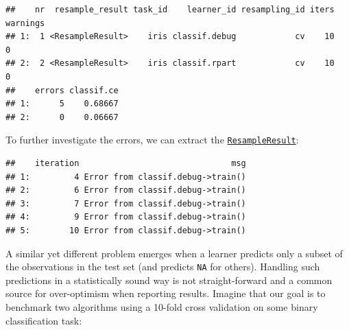 \documentclass[]{scrbook}
\newenvironment{Shaded}{\begin{snugshade}}{\end{snugshade}}
\newcommand{\DataTypeTok}[1]{\textcolor[rgb]{0.13,0.29,0.53}{#1}}
\newcommand{\FloatTok}[1]{\textcolor[rgb]{0.00,0.00,0.81}{#1}}
\newcommand{\KeywordTok}[1]{\textcolor[rgb]{0.13,0.29,0.53}{\textbf{#1}}}
\newcommand{\NormalTok}[1]{#1}
\newcommand{\OperatorTok}[1]{\textcolor[rgb]{0.81,0.36,0.00}{\textbf{#1}}}
\newcommand{\OtherTok}[1]{\textcolor[rgb]{0.56,0.35,0.01}{#1}}
\newcommand{\StringTok}[1]{\textcolor[rgb]{0.31,0.60,0.02}{#1}}
\renewenvironment{Shaded} {\begin{snugshade}\small} {\end{snugshade}}
\begin{document}
\begin{Shaded}
\end{Shaded}

\begin{verbatim}
##    nr  resample_result task_id    learner_id resampling_id iters warnings
## 1:  1 <ResampleResult>    iris classif.debug            cv    10        0
## 2:  2 <ResampleResult>    iris classif.rpart            cv    10        0
##    errors classif.ce
## 1:      5    0.68667
## 2:      0    0.06667
\end{verbatim}

To further investigate the errors, we can extract the \href{https://mlr3.mlr-org.com/reference/ResampleResult.html}{\texttt{ResampleResult}}:

\begin{Shaded}
\end{Shaded}

\begin{verbatim}
##    iteration                               msg
## 1:         4 Error from classif.debug->train()
## 2:         6 Error from classif.debug->train()
## 3:         7 Error from classif.debug->train()
## 4:         9 Error from classif.debug->train()
## 5:        10 Error from classif.debug->train()
\end{verbatim}

A similar yet different problem emerges when a learner predicts only a subset of the observations in the test set (and predicts \texttt{NA} for others).
Handling such predictions in a statistically sound way is not straight-forward and a common source for over-optimism when reporting results.
Imagine that our goal is to benchmark two algorithms using a 10-fold cross validation on some binary classification task:
\end{document}
